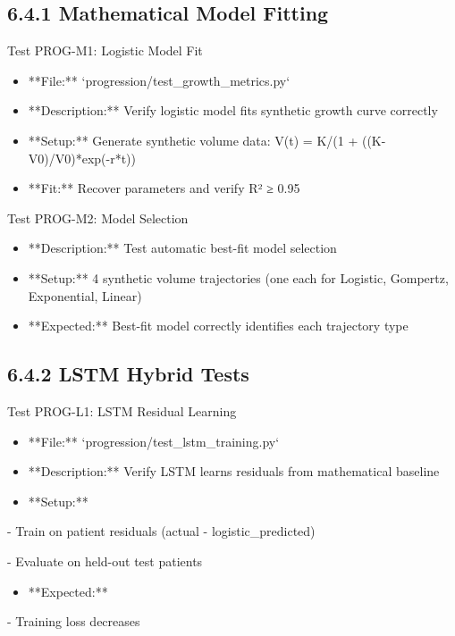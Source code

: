 \subsection{6.4.1 Mathematical Model Fitting}
Test PROG-M1: Logistic Model Fit

\begin{itemize}
  \item **File:** `progression/test\_growth\_metrics.py`
  \item **Description:** Verify logistic model fits synthetic growth curve correctly
  \item **Setup:** Generate synthetic volume data: V(t) = K/(1 + ((K-V0)/V0)*exp(-r*t))
  \item **Fit:** Recover parameters and verify R² ≥ 0.95
\end{itemize}

Test PROG-M2: Model Selection

\begin{itemize}
  \item **Description:** Test automatic best-fit model selection
  \item **Setup:** 4 synthetic volume trajectories (one each for Logistic, Gompertz, Exponential, Linear)
  \item **Expected:** Best-fit model correctly identifies each trajectory type
\end{itemize}


\subsection{6.4.2 LSTM Hybrid Tests}
Test PROG-L1: LSTM Residual Learning

\begin{itemize}
  \item **File:** `progression/test\_lstm\_training.py`
  \item **Description:** Verify LSTM learns residuals from mathematical baseline
  \item **Setup:**
\end{itemize}

- Train on patient residuals (actual - logistic\_predicted)

- Evaluate on held-out test patients

\begin{itemize}
  \item **Expected:**
\end{itemize}

- Training loss decreases

